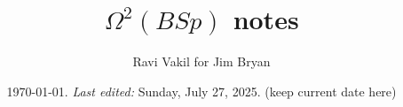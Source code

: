 \newcommand{\aff}{\rm{aff}}

\newcommand{\Gr}{\rm{Gr}}
\newcommand{\LGr}{\rm{LGr}}
\newcommand{\SAG}{\rm{SpAfGr}}
\newcommand{\LSG}{\rm{LgStGr}}

\newcommand{\jalpha}{\mathord{j\mkern-7mu\alpha}}
\newcommand{\vjalpha}{\vec{\jalpha}}

\newcommand{\Id}{\rm{Id}}



\newcommand{\remind}[1]{{\bf[{\large TODO:  } #1]}}
\newcommand{\lremind}[1]{{\bf[label:  #1]}}
\newcommand{\notation}[1]{}
\renewcommand{\lremind}[1]{{}}

\newcommand{\ravi}[1]{{\bf [#1 --- Ravi]}}
\newcommand{\hidden}[1]{\footnote{Hidden:  #1}}

\newcommand{\cut}[1]{}


\newcommand{\leftbox}[1]{      \begin{flushleft}\fbox{ \parbox{25em}{
#1        }}\end{flushleft}
}\newcommand{\centerbox}[1]{      \begin{center}\fbox{ \parbox{25em}{
#1        }}\end{center}
}
\newcommand{\rightbox}[1]{      \begin{flushright}\fbox{ \parbox{25em}{
#1        }}\end{flushright}
}



\pagestyle{plain}
\title{\Large{$\Omega^2(BSp)$ notes}}
\author{Ravi Vakil for Jim Bryan}
\date{\today .   {\em Last edited:}
 Sunday, July 27, 2025. (keep current date here)  }
\maketitle
\tableofcontents


